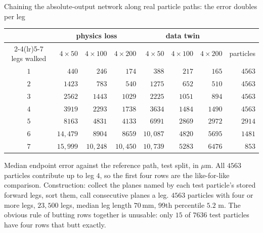 \documentclass[aspectratio=169,10pt]{beamer}
\newcommand{\mm}{\ensuremath{\,\mathrm{mm}}}
\begin{document}
\begin{frame}[shrink=25]{Chaining the absolute-output network along real particle paths: the error doubles per leg}
  \vspace{2mm}
  \centering\small
  \begin{tabular}{@{}crrrrrrr@{}}
    \toprule
    & \multicolumn{3}{c}{physics loss} & \multicolumn{3}{c}{data twin} & \\
    \cmidrule(lr){2-4}\cmidrule(lr){5-7}
    legs walked & $4\times50$ & $4\times100$ & $4\times200$ & $4\times50$ & $4\times100$ & $4\times200$ & particles \\
    \midrule
    $1$ & $440$      & $246$      & $174$      & $388$      & $217$   & $165$   & $4563$ \\
    $2$ & $1423$     & $783$      & $540$      & $1275$     & $652$   & $510$   & $4563$ \\
    $3$ & $2562$     & $1443$     & $1029$     & $2225$     & $1051$  & $894$   & $4563$ \\
    $4$ & $3919$     & $2293$     & $1738$     & $3634$     & $1484$  & $1490$  & $4563$ \\
    $5$ & $8163$     & $4831$     & $4133$     & $6991$     & $2869$  & $2972$  & $2914$ \\
    $6$ & $14{,}479$ & $8904$     & $8659$     & $10{,}087$ & $4820$  & $5695$  & $1481$ \\
    $7$ & $15{,}999$ & $10{,}248$ & $10{,}450$ & $10{,}739$ & $5283$  & $6476$  & $853$ \\
    \bottomrule
  \end{tabular}
  \vspace{1mm}

  {\scriptsize Median endpoint error against the reference path, test split, in
   $\mu$m. All $4563$ particles contribute up to leg $4$, so the first four rows
   are the like-for-like comparison. Construction: collect the planes named by
   each test particle's stored forward legs, sort them, call consecutive planes
   a leg. $4563$ particles with four or more legs, $23{,}500$ legs, median leg
   length $70\mm$, 99th percentile $5.2$ m. The obvious rule of butting rows
   together is unusable: only $15$ of $7636$ test particles have four rows that
   butt exactly.}
  \vspace{2mm}


\end{frame}
\end{document}
